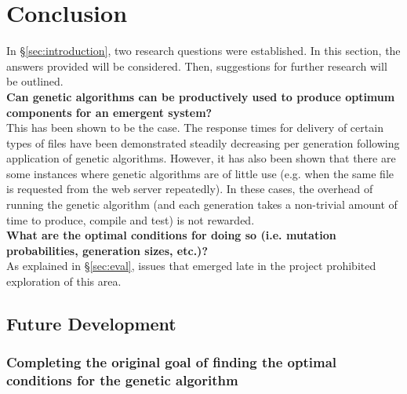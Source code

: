 \documentclass[compsoc,12pt,a4paper]{IEEEtran}
\begin{document}
	\newpage
	
	\section{Conclusion}

		In \S \ref{sec:introduction}, two research questions were established. In this section, the answers provided will be considered. Then, suggestions for further research will be outlined.\\
		
		\noindent\textbf{Can genetic algorithms can be productively used to produce optimum components for an emergent system?}\\
		
		\noindent This has been shown to be the case. The response times for delivery of certain types of files have been demonstrated steadily decreasing per generation following application of genetic algorithms. However, it has also been shown that there are some instances where genetic algorithms are of little use (e.g. when the same file is requested from the web server repeatedly). In these cases, the overhead of running the genetic algorithm (and each generation takes a non-trivial amount of time to produce, compile and test) is not rewarded.\\
		
		\noindent\textbf{What are the optimal conditions for doing so (i.e. mutation probabilities, generation sizes, etc.)?}\\
			
		\noindent As explained in \S\ref{sec:eval}, issues that emerged late in the project prohibited exploration of this area.
		
		\subsection{Future Development}
		
			\subsubsection{Completing the original goal of finding the optimal conditions for the genetic algorithm}
			
\end{document}
